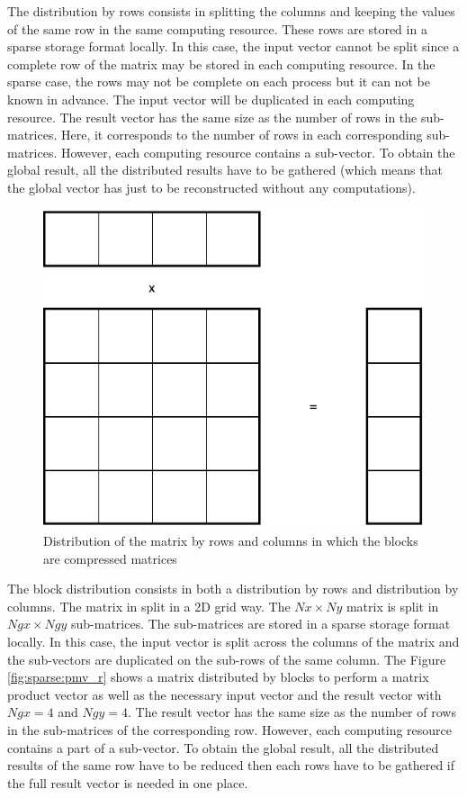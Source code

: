 The distribution by rows consists in splitting the columns and keeping the values of the same row in the same computing resource.
These rows are stored in a sparse storage format locally.
In this case, the input vector cannot be split since a complete row of the matrix may be stored in each computing resource.
In the sparse case, the rows may not be complete on each process but it can not be known in advance.
The input vector will be duplicated in each computing resource.
The result vector has the same size as the number of rows in the sub-matrices.
Here, it corresponds to the number of rows in each corresponding sub-matrices.
However, each computing resource contains a sub-vector.
To obtain the global result, all the distributed results have to be gathered (which means that the global vector has just to be reconstructed without any computations).


\begin{figure}[h]
	\centering
	\includegraphics[width=.5\textwidth]{pmv_2D}
	\caption{Distribution of the matrix by rows and columns in which the blocks are compressed matrices \label{fig:sparse:pmv_2D}}
\end{figure}

The block distribution consists in both a distribution by rows and distribution by columns.
The matrix in split in a 2D grid way.
The $Nx \times Ny$ matrix is split in $Ngx \times Ngy$ sub-matrices.
The sub-matrices are stored in a sparse storage format locally.
In this case, the input vector is split across the columns of the matrix and the sub-vectors are duplicated on the sub-rows of the same column.
The Figure \ref{fig:sparse:pmv_r} shows a matrix distributed by blocks to perform a matrix product vector as well as the necessary input vector and the result vector with $Ngx = 4$ and $Ngy = 4$.
The result vector has the same size as the number of rows in the sub-matrices of the corresponding row.
However, each computing resource contains a part of a sub-vector.
To obtain the global result, all the distributed results of the same row have to be reduced then each rows have to be gathered if the full result vector is needed in one place.


